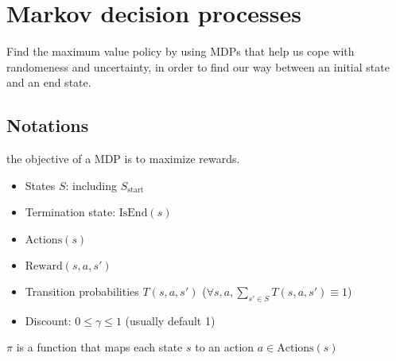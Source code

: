 \section{Markov decision processes}

Find the maximum value policy by using MDPs that help us cope with randomeness
and uncertainty, in order to find our way between an initial state and an end
state.

\subsection{Notations}

 the objective of a MDP is to maximize rewards.\begin{itemize}
    \item States $S$: including $S_\text{start}$
    \item Termination state: $\text{IsEnd}(s)$
    \item $\text{Actions}(s)$
    \item $\text{Reward}(s,a,s')$
    \item Transition probabilities $T(s,a,s')$ ($\forall s,a, \sum_{s'\in S} T(s,a,s') \equiv 1$)
    \item Discount: $0 \le \gamma \le 1$ (usually default 1)
\end{itemize}

 $\pi$ is a function that maps each state $s$ to an action $a \in
\text{Actions}(s)$